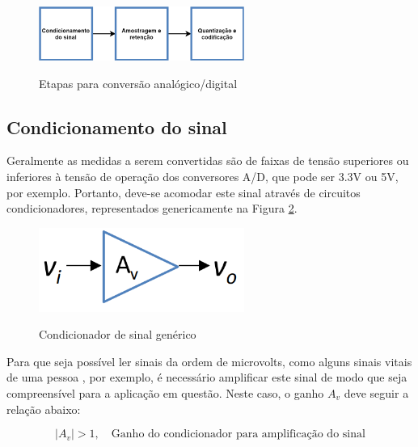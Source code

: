 \documentclass[oneside,openright,12pt]{ufsm_2015} %
\begin{document}
\begin{figure}[ht]
    \caption{\label{exepretex} Etapas para conversão analógico/digital}
    \centering
    \includegraphics[width=0.6\textwidth]{figuras/conversor.png}
    \vspace{\baselineskip} %
        \label{fig:etapas-conversor}
\end{figure}

\subsection{Condicionamento do sinal}
Geralmente as medidas a serem convertidas são de faixas de tensão superiores ou inferiores à tensão de operação dos conversores A/D, que pode ser 3.3V ou 5V, por exemplo. Portanto, deve-se acomodar este sinal através de circuitos condicionadores, representados genericamente na Figura \ref{fig:condicionador-de-sinal-generico}.

\begin{figure}[ht]
    \caption{\label{exepretex} Condicionador de sinal genérico}
    \centering
    \includegraphics[width=0.6\textwidth]{figuras/condicionador-de-sinal.png}
    \vspace{\baselineskip} %
        \label{fig:condicionador-de-sinal-generico}
\end{figure}

Para que seja possível ler sinais da ordem de microvolts, como alguns sinais vitais de uma pessoa \cite{zhang2014signal}, por exemplo, é necessário amplificar este sinal de modo que seja compreensível para a aplicação em questão. Neste caso, o ganho $A_{v}$ deve seguir a relação abaixo: 

\begin{equation}\label{eq:condicionador-amplificador}
    |A_{v}| > 1,\quad \text{Ganho do condicionador para amplificação do sinal}    
\end{equation}
\end{document}
